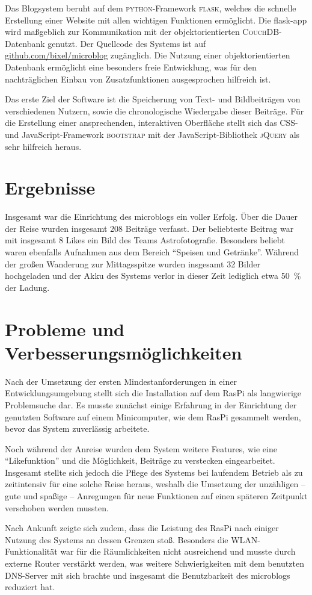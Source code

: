 Das Blogsystem beruht auf dem \textsc{python}-Framework \textsc{flask},
welches die schnelle Erstellung einer Website mit allen wichtigen Funktionen
ermöglicht.
Die flask-app wird maßgeblich zur Kommunikation mit der objektorientierten
\textsc{CouchDB}-Datenbank genutzt.  Der Quellcode des Systems ist auf
\href{https://github.com/bixel/microblog}{github.com/bixel/microblog}
zugänglich.
Die Nutzung einer objektorientierten Datenbank ermöglicht eine besonders
freie Entwicklung, was für den nachträglichen Einbau von Zusatzfunktionen
ausgesprochen hilfreich ist.

Das erste Ziel der Software ist die Speicherung von Text- und Bildbeiträgen
von verschiedenen Nutzern, sowie die chronologische Wiedergabe dieser Beiträge.
Für die Erstellung einer ansprechenden, interaktiven Oberfläche
stellt sich das CSS- und JavaScript-Framework \textsc{bootstrap} mit der 
JavaScript-Bibliothek \textsc{jQuery} als sehr hilfreich
heraus.

\section{Ergebnisse}
Insgesamt war die Einrichtung des microblogs ein voller Erfolg.
Über die Dauer der Reise wurden insgesamt 208 Beiträge verfasst.
Der beliebteste Beitrag war mit insgesamt \num{8} Likes ein Bild
des Teams Astrofotografie.
Besonders beliebt waren ebenfalls Aufnahmen aus dem Bereich
\enquote{Speisen und Getränke}.
Während der großen Wanderung zur Mittagsspitze wurden insgesamt \num{32}
Bilder hochgeladen und der Akku des Systems verlor in dieser Zeit
lediglich etwa \SI{50}{\percent} der Ladung.

\section{Probleme und Verbesserungsmöglichkeiten}
Nach der Umsetzung der ersten Mindestanforderungen in einer
Entwicklungsumgebung stellt sich die Installation auf dem RasPi als
langwierige Problemsuche dar.
Es musste zunächst einige Erfahrung in der Einrichtung der genutzten
Software auf einem Minicomputer, wie dem RasPi gesammelt werden,
bevor das System zuverlässig arbeitete.

Noch während der Anreise wurden dem System weitere Features, wie eine
\enquote{Likefunktion} und die Möglichkeit, Beiträge zu verstecken
eingearbeitet.
Insgesamt stellte sich jedoch die Pflege des Systems bei laufendem Betrieb als
zu zeitintensiv für eine solche Reise heraus, weshalb die Umsetzung der
unzähligen -- gute und spaßige -- Anregungen für neue Funktionen
auf einen späteren Zeitpunkt verschoben werden mussten.

Nach Ankunft zeigte sich zudem, dass die Leistung des RasPi nach einiger
Nutzung des Systems an dessen Grenzen stoß. Besonders die WLAN-Funktionalität
war für die Räumlichkeiten nicht ausreichend und musste durch externe Router
verstärkt werden, was weitere Schwierigkeiten mit dem benutzten DNS-Server
mit sich brachte und insgesamt die Benutzbarkeit des microblogs reduziert hat.


